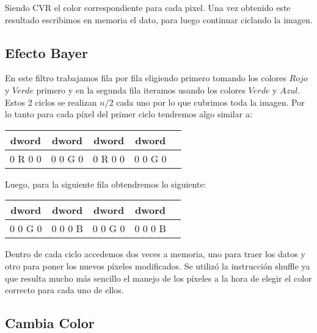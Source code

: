 Siendo CVR el color correspondiente para cada pixel.
Una vez obtenido este resultado escribimos en memoria el dato, para luego continuar ciclando la imagen. 


\subsection{Efecto Bayer}

En este filtro trabajamos fila por fila eligiendo primero tomando los colores $Rojo$ y $Verde$ primero y en la segunda fila iteramos usando los colores $Verde$ y $Azul$. Estos 2 ciclos se realizan $n/2$ cada uno
por lo que cubrimos toda la imagen. 
Por lo tanto para cada píxel del primer ciclo tendremos algo similar a:

\begin{table}[h]
\begin{center}
\begin{tabular}{|c|c|c|c|c|}
\hline
dword     & dword     & dword     & dword     \\ \hline
0 R 0 0     & 0 0 G 0     & 0 R 0 0     & 0 0 G 0        \\ \hline
\end{tabular}
\end{center}
\end{table}

Luego, para la siguiente fila obtendremos lo siguiente:


\begin{table}[h]
\begin{center}
\begin{tabular}{|c|c|c|c|c|}
\hline
dword     & dword     & dword     & dword     \\ \hline
0 0 G 0     & 0 0 0 B     & 0 0 G 0     & 0 0 0 B       \\ \hline
\end{tabular}
\end{center}
\end{table}


Dentro de cada ciclo accedemos dos veces a memoria, uno para traer los datos y otro para poner los nuevos píxeles modificados. Se utilizó la instrucción shuffle ya que resulta mucho más sencillo el manejo de los píxeles a la hora de elegir el color correcto para cada uno de ellos. 


\subsection{Cambia Color}

